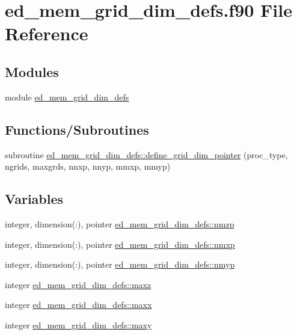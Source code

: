 \hypertarget{ed__mem__grid__dim__defs_8f90}{}\section{ed\+\_\+mem\+\_\+grid\+\_\+dim\+\_\+defs.\+f90 File Reference}
\label{ed__mem__grid__dim__defs_8f90}
\subsection*{Modules}
\begin{DoxyCompactItemize}
\item 
module \hyperlink{namespaceed__mem__grid__dim__defs}{ed\+\_\+mem\+\_\+grid\+\_\+dim\+\_\+defs}
\end{DoxyCompactItemize}
\subsection*{Functions/\+Subroutines}
\begin{DoxyCompactItemize}
\item 
subroutine \hyperlink{namespaceed__mem__grid__dim__defs_ad239d701d9000451504dc71a6a3b538a}{ed\+\_\+mem\+\_\+grid\+\_\+dim\+\_\+defs\+::define\+\_\+grid\+\_\+dim\+\_\+pointer} (proc\+\_\+type, ngrids, maxgrds,                               nnxp, nnyp, mmxp, mmyp)
\end{DoxyCompactItemize}
\subsection*{Variables}
\begin{DoxyCompactItemize}
\item 
integer, dimension(\+:), pointer \hyperlink{namespaceed__mem__grid__dim__defs_a1922a1169c2a61922996eb3cb1571231}{ed\+\_\+mem\+\_\+grid\+\_\+dim\+\_\+defs\+::nmzp}
\item 
integer, dimension(\+:), pointer \hyperlink{namespaceed__mem__grid__dim__defs_a57ab8eb1467e9e968a109f132aef7382}{ed\+\_\+mem\+\_\+grid\+\_\+dim\+\_\+defs\+::nmxp}
\item 
integer, dimension(\+:), pointer \hyperlink{namespaceed__mem__grid__dim__defs_a05d50362fba68ca90db983160e8a5213}{ed\+\_\+mem\+\_\+grid\+\_\+dim\+\_\+defs\+::nmyp}
\item 
integer \hyperlink{namespaceed__mem__grid__dim__defs_aff75646038b2a6839b9d2a9faa7672d8}{ed\+\_\+mem\+\_\+grid\+\_\+dim\+\_\+defs\+::maxz}
\item 
integer \hyperlink{namespaceed__mem__grid__dim__defs_a53ce5ed3feaad0ea89bb77b8fc3fa220}{ed\+\_\+mem\+\_\+grid\+\_\+dim\+\_\+defs\+::maxx}
\item 
integer \hyperlink{namespaceed__mem__grid__dim__defs_a83f50efdee1a0d683634a441b608b988}{ed\+\_\+mem\+\_\+grid\+\_\+dim\+\_\+defs\+::maxy}
\end{DoxyCompactItemize}

